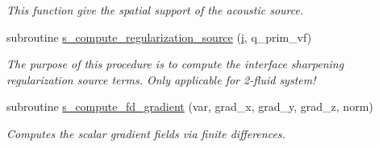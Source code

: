 \begin{DoxyCompactItemize}
\begin{DoxyCompactList}\small\item\em This function give the spatial support of the acoustic source. \end{DoxyCompactList}\item 
subroutine \hyperlink{namespacem__rhs_aa1cd3a5b83eabb0344ecae0cf321ca87}{s\+\_\+compute\+\_\+regularization\+\_\+source} (\hyperlink{m__rhs_8f90_aaea4baed8fd8b780f6938f0dc1fb0f72}{i}, q\+\_\+prim\+\_\+vf)
\begin{DoxyCompactList}\small\item\em The purpose of this procedure is to compute the interface sharpening regularization source terms. Only applicable for 2-\/fluid system! \end{DoxyCompactList}\item 
subroutine \hyperlink{namespacem__rhs_abf11c6f8bb16f3c74cc0205b16d31e96}{s\+\_\+compute\+\_\+fd\+\_\+gradient} (var, grad\+\_\+x, grad\+\_\+y, grad\+\_\+z, norm)
\begin{DoxyCompactList}\small\item\em Computes the scalar gradient fields via finite differences. \end{DoxyCompactList}\end{DoxyCompactItemize}
\textbf{ }\par
